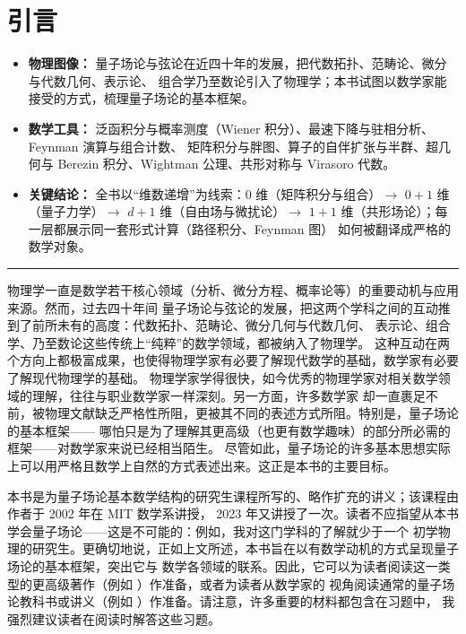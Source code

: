 \section*{引言}
{}

\begin{keytakeaways}
\begin{itemize}
  \item \textbf{物理图像：} 量子场论与弦论在近四十年的发展，把代数拓扑、范畴论、微分与代数几何、表示论、
        组合学乃至数论引入了物理学；本书试图以数学家能接受的方式，梳理量子场论的基本框架。
  \item \textbf{数学工具：} 泛函积分与概率测度（Wiener 积分）、最速下降与驻相分析、Feynman 演算与组合计数、
        矩阵积分与胖图、算子的自伴扩张与半群、超几何与 Berezin 积分、Wightman 公理、共形对称与 Virasoro 代数。
  \item \textbf{关键结论：} 全书以“维数递增”为线索：$0$ 维（矩阵积分与组合）$\to$ $0+1$ 维（量子力学）$\to$
        $d+1$ 维（自由场与微扰论）$\to$ $1+1$ 维（共形场论）；每一层都展示同一套形式计算（路径积分、Feynman 图）
        如何被翻译成严格的数学对象。
\end{itemize}
\end{keytakeaways}

\bigskip
\noindent\rule{\textwidth}{0.6pt}
\bigskip

物理学一直是数学若干核心领域（分析、微分方程、概率论等）的重要动机与应用来源。然而，过去四十年间
量子场论与弦论的发展，把这两个学科之间的互动推到了前所未有的高度：代数拓扑、范畴论、微分几何与代数几何、
表示论、组合学、乃至数论这些传统上“纯粹”的数学领域，都被纳入了物理学。
这种互动在两个方向上都极富成果，也使得物理学家有必要了解现代数学的基础，数学家有必要了解现代物理学的基础。
物理学家学得很快，如今优秀的物理学家对相关数学领域的理解，往往与职业数学家一样深刻。另一方面，许多数学家
却一直裹足不前，被物理文献缺乏严格性所阻，更被其不同的表述方式所阻。特别是，量子场论的基本框架——
哪怕只是为了理解其更高级（也更有数学趣味）的部分所必需的框架——对数学家来说已经相当陌生。
尽管如此，量子场论的许多基本思想实际上可以用严格且数学上自然的方式表述出来。这正是本书的主要目标。

本书是为量子场论基本数学结构的研究生课程所写的、略作扩充的讲义；该课程由作者于 2002 年在 MIT 数学系讲授，
2023 年又讲授了一次。读者不应指望从本书学会量子场论——这是不可能的：例如，我对这门学科的了解就少于一个
初学物理的研究生。更确切地说，正如上文所述，本书旨在以有数学动机的方式呈现量子场论的基本框架，突出它与
数学各领域的联系。因此，它可以为读者阅读这一类型的更高级著作（例如 \cite{QFS}）作准备，或者为读者从数学家的
视角阅读通常的量子场论教科书或讲义（例如 \cite{Co,W,IZ,PS}）作准备。请注意，许多重要的材料都包含在习题中，
我强烈建议读者在阅读时解答这些习题。

